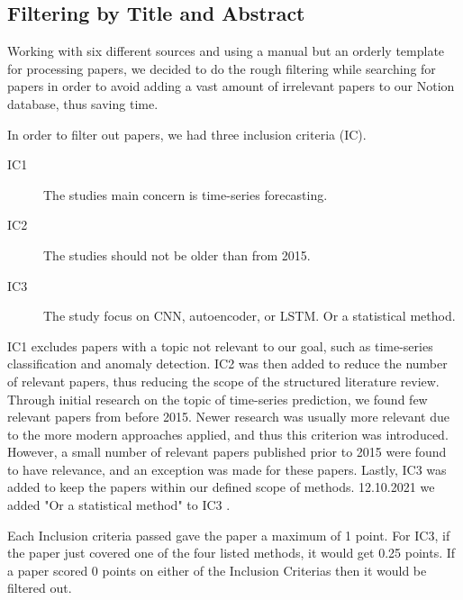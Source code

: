 \subsection{Filtering by Title and Abstract}
Working with six different sources and using a manual but an orderly template for processing papers,
we decided to do the rough filtering while searching for papers in order to avoid adding a vast amount of irrelevant
papers to our Notion database, thus saving time.

In order to filter out papers, we had three inclusion criteria (IC).
\begin{description}
  \item[IC1] The studies main concern is time-series forecasting.
  \item[IC2] The studies should not be older than from 2015.
  \item[IC3] The study focus on CNN, autoencoder, or LSTM. Or a statistical method.
\end{description}
IC1 excludes papers with a topic not relevant to our goal, such as time-series classification and anomaly detection.
IC2 was then added to reduce the number of relevant papers, thus reducing the scope of the structured literature review.
Through initial research on the topic of time-series prediction, we found few relevant papers from before 2015.
Newer research was usually more relevant due to the more modern approaches applied, and thus this criterion was introduced.
However, a small number of relevant papers published prior to 2015 were found to have relevance, and an exception was made for these papers.
Lastly, IC3 was added to keep the papers within our defined scope of methods. 12.10.2021 we added "Or a statistical method"
to IC3 \citep{decisionmatrix}.

Each Inclusion criteria passed gave the paper a maximum of 1 point. For IC3, if the paper just covered one of the
four listed methods, it would get 0.25 points. If a paper scored 0 points on either of the Inclusion Criterias then
it would be filtered out.

